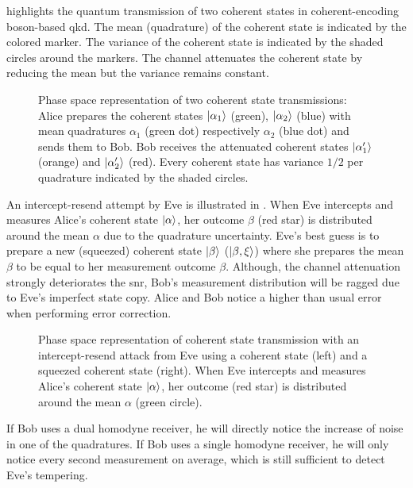  highlights the quantum transmission of two coherent states in coherent-encoding boson-based \gls{qkd}.
The mean (quadrature) of the coherent state is indicated by the colored marker.
The variance of the coherent state is indicated by the shaded circles around the markers.
The channel attenuates the coherent state by reducing the mean but the variance remains constant.
\begin{figure}[htb]
	\centering
	
	\caption{Phase space representation of two coherent state transmissions: Alice prepares the coherent states $\ket{\alpha_1}$ (green), $\ket{\alpha_2}$ (blue) with mean quadratures $\alpha_1$ (green dot) respectively $\alpha_2$ (blue dot) and sends them to Bob. Bob receives the attenuated coherent states $\ket{\alpha_1^\prime}$ (orange) and $\ket{\alpha_2^\prime}$ (red). Every coherent state has variance $1/2$ per quadrature indicated by the shaded circles.}\label{fig:phase_space_coherent}
\end{figure}
An intercept-resend attempt by Eve is illustrated in .
When Eve intercepts and measures Alice's coherent state $\ket{\alpha}$, her outcome $\beta$ (red star) is distributed around the mean $\alpha$ due to the quadrature uncertainty.
Eve's best guess is to prepare a new (squeezed) coherent state $\ket{\beta}$ ($\ket{\beta,\xi}$) where she prepares the mean $\beta$ to be equal to her measurement outcome $\beta$.
Although, the channel attenuation strongly deteriorates the \gls{snr}, Bob's measurement distribution will be ragged due to Eve's imperfect state copy.
Alice and Bob notice a higher than usual error when performing error correction.
\begin{figure}[htb]
	\centering
	
	\caption{Phase space representation of coherent state transmission with an intercept-resend attack from Eve using a coherent state (left) and a squeezed coherent state (right). When Eve intercepts and measures Alice's coherent state $\ket{\alpha}$, her outcome (red star) is distributed around the mean $\alpha$ (green circle). }\label{fig:phase_space_intercept_resend}
\end{figure}
If Bob uses a dual homodyne receiver, he will directly notice the increase of noise in one of the quadratures.
If Bob uses a single homodyne receiver, he will only notice every second measurement on average, which is still sufficient to detect Eve's tempering.